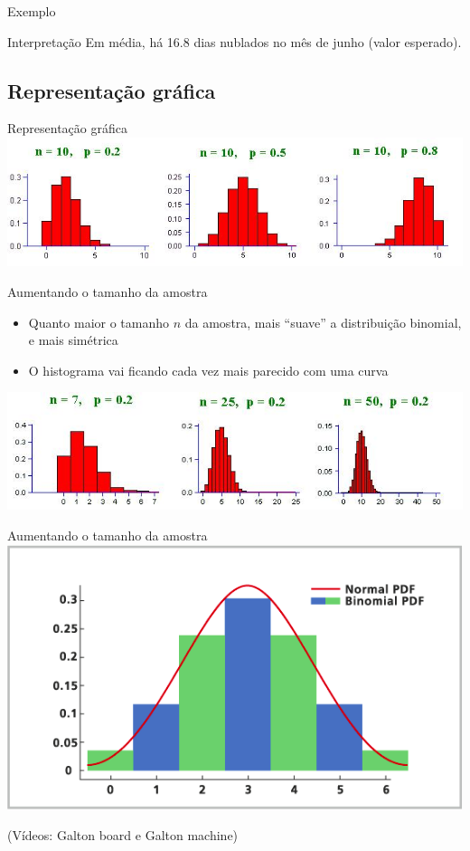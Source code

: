 \documentclass{beamer}
\begin{document}
\begin{frame}{Exemplo}
  \begin{block}{Interpretação}
    Em média, há 16.8 dias nublados no mês de junho (valor esperado).
  \end{block}
\end{frame}

\subsection{Representação gráfica}

\begin{frame}{Representação gráfica}
\includegraphics[width=\textwidth]{Prob_II/binomial}
\end{frame}

\begin{frame}{Aumentando o tamanho da amostra}
  \begin{itemize}
  \item Quanto maior o tamanho $n$ da amostra, mais ``suave'' a
    distribuição binomial, e mais simétrica
  \item O histograma vai ficando cada vez mais parecido com uma curva
  \end{itemize}
  \includegraphics[width=\textwidth]{Prob_II/binomial2}

\end{frame}

\begin{frame}{Aumentando o tamanho da amostra}
  \includegraphics[width=\textwidth]{Prob_II/aproximacao}

  (Vídeos: Galton board e Galton machine)
\end{frame}
\end{document}
